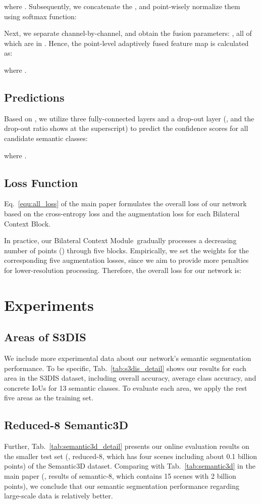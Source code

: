 \documentclass[10pt,twocolumn,letterpaper]{article}
\def\ourencoder{Bilateral Context Module}
\def\ourblock{Bilateral Context Block}
\begin{document}
where . Subsequently, we concatenate the , and point-wisely normalize them using softmax function:

Next, we separate  channel-by-channel, and obtain the fusion parameters: , all of which are in . Hence, the point-level adaptively fused feature map is calculated as:

where .

\subsection{Predictions}
Based on , we utilize three fully-connected layers and a drop-out layer (, and the drop-out ratio shows at the superscript) to predict the confidence scores for all  candidate semantic classes:

where .
\subsection{Loss Function} Eq.~\ref{equ:all_loss} of the main paper formulates the overall loss  of our network based on the cross-entropy loss  and the augmentation loss  for each \ourblock.

In practice, our \ourencoder~gradually processes a decreasing number of points () through five blocks. Empirically, we set the weights  for the corresponding five augmentation losses, since we aim to provide more penalties for lower-resolution processing. Therefore, the overall loss for our network is:


\section{Experiments}
\subsection{Areas of S3DIS}
We include more experimental data about our network's semantic segmentation performance. To be specific, Tab.~\ref{tab:s3dis_detail} shows our results for each area in the S3DIS dataset, including overall accuracy, average class accuracy, and concrete IoUs for 13 semantic classes. To evaluate each area, we apply the rest five areas as the training set.

\subsection{Reduced-8 Semantic3D}
Further, Tab.~\ref{tab:semantic3d_detail} presents our online evaluation results on the smaller test set (\ie, reduced-8, which has four scenes including about 0.1 billion points) of the Semantic3D dataset. Comparing with Tab.~\ref{tab:semantic3d} in the main paper (\ie, results of semantic-8, which contains 15 scenes with 2 billion points), we conclude that our semantic segmentation performance regarding large-scale data is relatively better.
\end{document}
